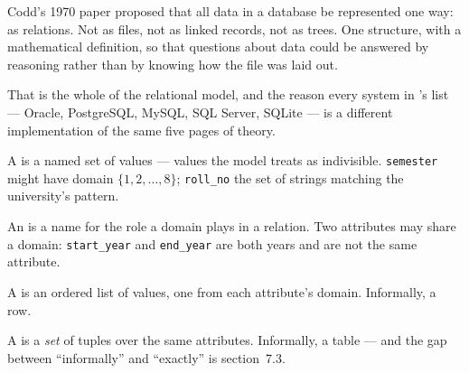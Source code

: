 Codd's 1970 paper proposed that all data in a database be represented one way:
as relations. Not as files, not as linked records, not as trees. One structure,
with a mathematical definition, so that questions about data could be answered
by reasoning rather than by knowing how the file was laid out.

That is the whole of the relational model, and the reason every system in
's list --- Oracle, PostgreSQL, MySQL, SQL Server, SQLite
--- is a different implementation of the same five pages of theory.

\begin{definitionbox}
A  is a named set of  values --- values the model
treats as indivisible. \texttt{semester} might have domain
$\{1,2,\dots,8\}$; \texttt{roll\_no} the set of strings matching the
university's pattern.

\smallskip
An  is a name for the role a domain plays in a relation. Two
attributes may share a domain: \texttt{start\_year} and \texttt{end\_year} are
both years and are not the same attribute.

\smallskip
A  is an ordered list of values, one from each attribute's domain.
Informally, a row.

\smallskip
A  is a \emph{set} of tuples over the same attributes.
Informally, a table --- and the gap between ``informally'' and ``exactly'' is
section~7.3.
\end{definitionbox}

